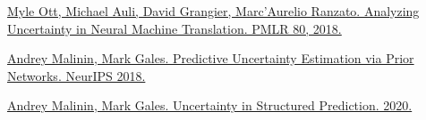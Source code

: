 \documentclass[a4paper,14pt]{extarticle}
\begin{document}
\begin{thebibliography}{0}
		\hypertarget{anal_uncertainty}{}
		\href{https://arxiv.org/pdf/1803.00047.pdf}
		{Myle Ott, Michael Auli, David Grangier, Marc'Aurelio Ranzato. Analyzing Uncertainty in Neural Machine Translation. PMLR 80, 2018.}
		
		\hypertarget{prior}{}
		\href{https://papers.nips.cc/paper/7936-predictive-uncertainty-estimation-via-prior-networks.pdf}
		{Andrey Malinin, Mark Gales. Predictive Uncertainty Estimation via Prior Networks. NeurIPS 2018.}
		
		\hypertarget{uncertainty}{}
		\href{https://arxiv.org/pdf/2002.07650.pdf}
		{Andrey Malinin, Mark Gales. Uncertainty in Structured Prediction. 2020.}
	\end{thebibliography}
\end{document}

